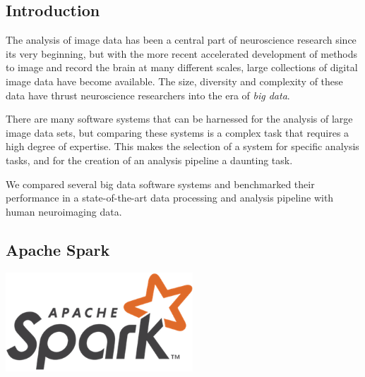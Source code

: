\documentclass[a0,landscape]{a0poster}
\begin{document}
\vspace{0.5cm} %


\begin{multicols}{3} %


\section*{Introduction}

The analysis of image data has been a central part of neuroscience research
since its very beginning, but with the more recent accelerated development of
methods to image and record the brain at many different scales, large
collections of digital image data have become available. The size, diversity and
complexity of these data have thrust neuroscience researchers into the era of
\emph{big data}.

There are many software systems that can be harnessed for the analysis of large
image data sets, but comparing these systems is a complex task that requires a
high degree of expertise. This makes the selection of a system for specific
analysis tasks, and for the creation of an analysis pipeline a daunting task.

\color{Navy}

We compared several big data software systems and benchmarked their performance
in a state-of-the-art data processing and analysis pipeline with human
neuroimaging data.

\color{DarkSlateGray}

\begin{minipage}[b]{0.75\linewidth}
  \subsection*{Apache Spark}
\end{minipage}
\begin{minipage}[b]{0.25\linewidth}
  \includegraphics[width=7cm]{spark-logo.png}
\end{minipage}


\end{multicols}
\end{document}

